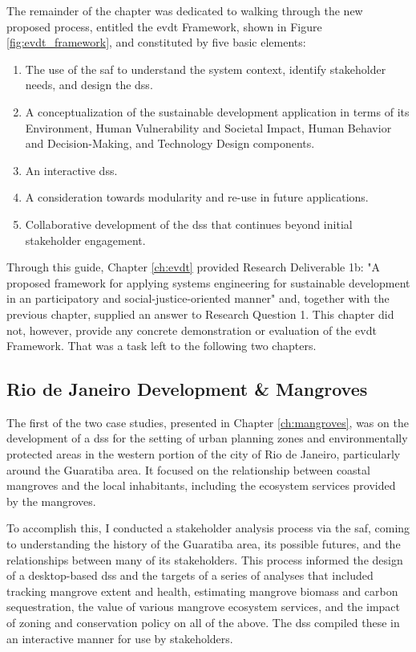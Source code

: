 The remainder of the chapter was dedicated to walking through the new proposed process, entitled the \ac{evdt} Framework, shown in Figure \ref{fig:evdt_framework}, and constituted by five basic elements:

\begin{enumerate}[label=\emph{\Alph*)},itemsep=0pt,parsep=0pt]
	\item{The use of the \acf{saf} to understand the system context, identify stakeholder needs, and design the \ac{dss}.}
	\item{A conceptualization of the sustainable development application in terms of its Environment, Human Vulnerability and Societal Impact, Human Behavior and Decision-Making, and Technology Design components.}
	\item{An interactive \ac{dss}.}
	\item{A consideration towards modularity and re-use in future applications.}
	\item{Collaborative development of the \ac{dss} that continues beyond initial stakeholder engagement.}
\end{enumerate}

Through this guide, Chapter \ref{ch:evdt} provided Research Deliverable 1b: "A proposed framework for applying systems engineering for sustainable development in an participatory and social-justice-oriented manner" and, together with the previous chapter, supplied an answer to Research Question 1. This chapter did not, however, provide any concrete demonstration or evaluation of the \ac{evdt} Framework. That was a task left to the following two chapters.

\subsection{Rio de Janeiro Development \& Mangroves}

The first of the two case studies, presented in Chapter \ref{ch:mangroves}, was on the development of a \ac{dss} for the setting of urban planning zones and environmentally protected areas in the western portion of the city of Rio de Janeiro, particularly around the Guaratiba area. It focused on the relationship between coastal mangroves and the local inhabitants, including the ecosystem services provided by the mangroves.

To accomplish this, I conducted a stakeholder analysis process via the \ac{saf}, coming to understanding the history of the Guaratiba area, its possible futures, and the relationships between many of its stakeholders. This process informed the design of a desktop-based \ac{dss} and the targets of a series of analyses that included tracking mangrove extent and health, estimating mangrove biomass and carbon sequestration, the value of various mangrove ecosystem services, and the impact of zoning and conservation policy on all of the above. The \ac{dss} compiled these in an interactive manner for use by stakeholders.

